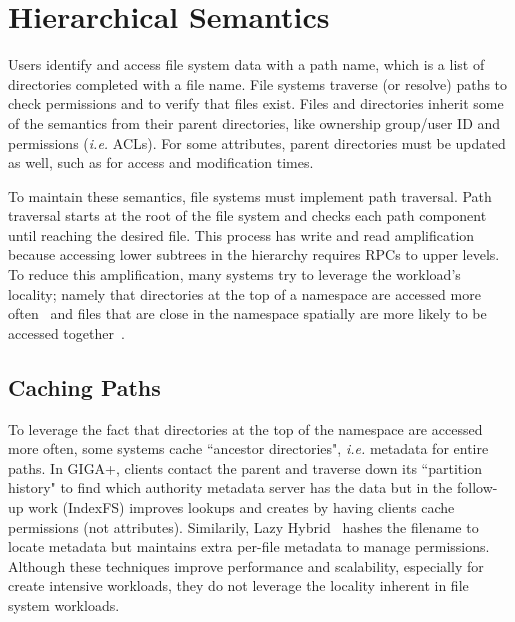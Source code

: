 \section{Hierarchical Semantics}

Users identify and access file system data with a path name, which is a list of
directories completed with a file name.  File systems traverse (or resolve)
paths to check permissions and to verify that files exist. Files and
directories inherit some of the semantics from their parent directories, like
ownership group/user ID and permissions ({\it i.e.} ACLs). For some attributes,
parent directories must be updated as well, such as for access and modification
times. 

To maintain these semantics, file systems must implement path traversal. Path
traversal starts at the root of the file system and checks each path component
until reaching the desired file. This process has write and read amplification
because accessing lower subtrees in the hierarchy requires RPCs to upper
levels. To reduce this amplification, many systems try to leverage the
workload's locality; namely that directories at the top of a namespace are
accessed more often~\cite{ren:sc2014-indexfs} and files that are close in the
namespace spatially are more likely to be accessed
together~\cite{weil:osdi2006-ceph, weil:sc2004-dyn-metadata}.

\subsection{Caching Paths}

To leverage the fact that directories at the top of the namespace are accessed
more often, some systems cache ``ancestor directories", {\it i.e.} metadata for
entire paths. In GIGA+, clients contact the parent and traverse down its
``partition history" to find which authority metadata server has the data but
in the follow-up work (IndexFS) improves lookups and creates by having clients
cache permissions (not attributes).  Similarily, Lazy
Hybrid~\cite{brandt:mss2003-lh} hashes the filename to locate metadata but
maintains extra per-file metadata to manage permissions.  Although these
techniques improve performance and scalability, especially for create intensive
workloads, they do not leverage the locality inherent in file system workloads.

